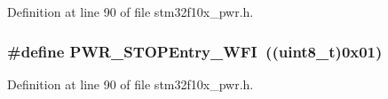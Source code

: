 Definition at line 90 of file stm32f10x\+\_\+pwr.\+h.

\subsubsection[{\texorpdfstring{P\+W\+R\+\_\+\+S\+T\+O\+P\+Entry\+\_\+\+W\+FI}{PWR_STOPEntry_WFI}}]{\setlength{\rightskip}{0pt plus 5cm}\#define P\+W\+R\+\_\+\+S\+T\+O\+P\+Entry\+\_\+\+W\+FI~(({\bf uint8\+\_\+t})0x01)}\hypertarget{group___s_t_o_p__mode__entry_gaa1e1362f3d0b93e8f5f674e18cfc96c4}{}\label{group___s_t_o_p__mode__entry_gaa1e1362f3d0b93e8f5f674e18cfc96c4}


Definition at line 90 of file stm32f10x\+\_\+pwr.\+h.

